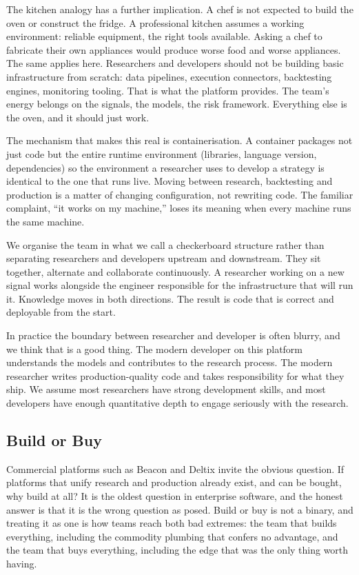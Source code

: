 \documentclass[
  11pt,
]{article}
\begin{document}
The kitchen analogy has a further implication. A chef is not expected to
build the oven or construct the fridge. A professional kitchen assumes a
working environment: reliable equipment, the right tools available.
Asking a chef to fabricate their own appliances would produce worse food
and worse appliances. The same applies here. Researchers and developers
should not be building basic infrastructure from scratch: data
pipelines, execution connectors, backtesting engines, monitoring
tooling. That is what the platform provides. The team's energy belongs
on the signals, the models, the risk framework. Everything else is the
oven, and it should just work.

The mechanism that makes this real is containerisation. A container
packages not just code but the entire runtime environment (libraries,
language version, dependencies) so the environment a researcher uses
to develop a strategy is identical to the one that runs live. Moving
between research, backtesting and production is a matter of changing
configuration, not rewriting code. The familiar complaint, ``it works
on my machine,'' loses its meaning when every machine runs the same
machine.

We organise the team in what we call a checkerboard structure rather
than separating researchers and developers upstream and downstream. They
sit together, alternate and collaborate continuously. A researcher
working on a new signal works alongside the engineer responsible for the
infrastructure that will run it. Knowledge moves in both directions. The
result is code that is correct and deployable from the start.

In practice the boundary between researcher and developer is often
blurry, and we think that is a good thing. The modern developer on this
platform understands the models and contributes to the research process.
The modern researcher writes production-quality code and takes
responsibility for what they ship. We assume most researchers have
strong development skills, and most developers have enough quantitative
depth to engage seriously with the research.

\subsection{Build or Buy}\label{build-or-buy}

Commercial platforms such as Beacon and Deltix invite the obvious
question. If platforms that unify research and production already exist,
and can be bought, why build at all? It is the oldest question in enterprise software, and the honest
answer is that it is the wrong question as posed. Build or buy is not a
binary, and treating it as one is how teams reach both bad extremes: the
team that builds everything, including the commodity plumbing that
confers no advantage, and the team that buys everything, including the
edge that was the only thing worth having.
\end{document}
